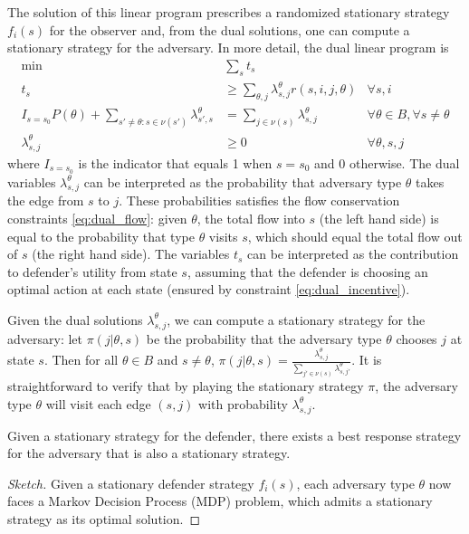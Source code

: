 The solution of this linear program prescribes a randomized stationary strategy $f_i(s)$ 
for the observer and, from the dual solutions, one can compute a stationary strategy for the adversary.
In more detail, the dual linear program is
\begin{align}
\min &\sum_{s}t_s\label{eq:dual_obj}\\
t_s&\geq \sum_{\theta, j}\lambda^\theta_{s,j}r(s,i,j,\theta) &\forall s,i \label{eq:dual_incentive}\\
I_{s=s_0}P(\theta)+\sum_{s' \neq \theta: s\in \nu(s')}\lambda^\theta_{s',s} &=\sum_{j\in\nu(s)}\lambda^\theta_{s,j} &\forall\theta\in B,\forall s\neq \theta\label{eq:dual_flow}\\
\lambda^\theta_{s,j}&\geq 0    &\forall \theta,s,j
\end{align}
where $I_{s=s_0}$ is the indicator that equals 1 when $s=s_0$ and 0 otherwise.
The dual variables $\lambda^\theta_{s,j}$
can be interpreted as the probability that
adversary type $\theta$ takes the edge from $s$ to $j$.
These probabilities satisfies the flow conservation constraints \eqref{eq:dual_flow}: given $\theta$, the total flow into $s$ (the left hand side) is equal to the probability that type $\theta$ visits $s$, which should equal the total flow out of $s$ (the right hand side).
The variables $t_s$ can be interpreted as the 
contribution to defender's utility from state $s$, assuming that the defender is choosing an optimal action at each state (ensured by constraint \eqref{eq:dual_incentive}). 

Given the dual solutions $\lambda^\theta_{s,j}$, 
we can compute a stationary strategy for the adversary:
let $\pi(j|\theta,s)$ be the probability that the adversary type $\theta$ chooses $j$ at state $s$.
Then for all $\theta\in B$ and $s\neq\theta$, $\pi(j|\theta,s)=
\frac{\lambda^\theta_{s,j}}{\sum_{j'\in\nu(s)}\lambda^\theta_{s,j'}}$.
It is straightforward to verify that by playing the stationary strategy $\pi$, the adversary
type $\theta$ will visit each edge $(s,j)$ with probability
$\lambda^\theta_{s,j}$.

\begin{lemma}
Given a stationary strategy for the defender, 
there exists a best response strategy for the adversary that is also a stationary strategy.
\end{lemma}
\begin{proof}[Sketch]
Given a stationary defender strategy $f_i(s)$, each adversary type $\theta$ now faces a Markov Decision Process (MDP)
problem, which admits a stationary strategy as its optimal solution.
\end{proof} 

